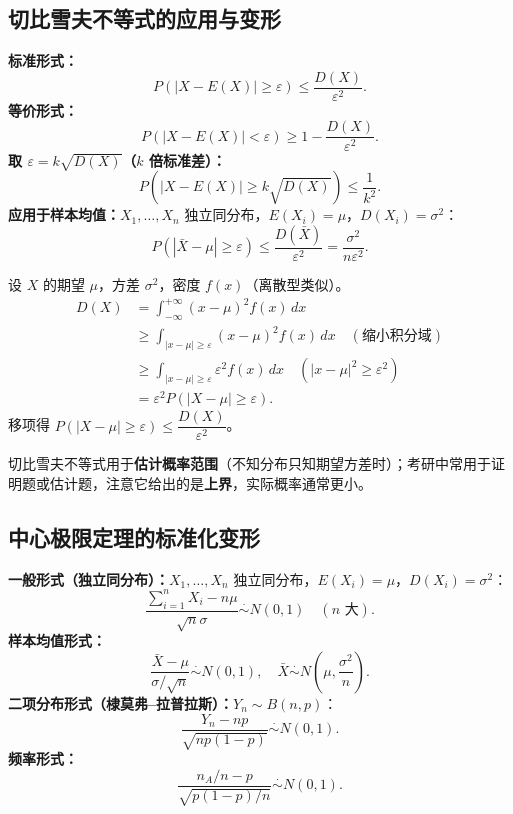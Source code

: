 \documentclass[11pt,a4paper]{article}
\begin{document}
\subsection{切比雪夫不等式的应用与变形}

\begin{variation}[切比雪夫不等式的变形]
\textbf{标准形式：}
\[
P(|X-E(X)|\geq \varepsilon) \leq \frac{D(X)}{\varepsilon^2}.
\]
\textbf{等价形式：}
\[
P(|X-E(X)|<\varepsilon) \geq 1 - \frac{D(X)}{\varepsilon^2}.
\]
\textbf{取 $\varepsilon=k\sqrt{D(X)}$（$k$ 倍标准差）：}
\[
P(|X-E(X)|\geq k\sqrt{D(X)}) \leq \frac{1}{k^2}.
\]
\textbf{应用于样本均值：}$X_1,\dots,X_n$ 独立同分布，$E(X_i)=\mu$，$D(X_i)=\sigma^2$：
\[
P(|\bar X-\mu|\geq \varepsilon) \leq \frac{D(\bar X)}{\varepsilon^2} = \frac{\sigma^2}{n\varepsilon^2}.
\]
\end{variation}

\begin{derivation}[切比雪夫不等式推导]
设 $X$ 的期望 $\mu$，方差 $\sigma^2$，密度 $f(x)$（离散型类似）。
\begin{align*}
D(X) &= \int_{-\infty}^{+\infty} (x-\mu)^2 f(x)\,dx \\
&\geq \int_{|x-\mu|\geq \varepsilon} (x-\mu)^2 f(x)\,dx \quad (\text{缩小积分域})\\
&\geq \int_{|x-\mu|\geq \varepsilon} \varepsilon^2 f(x)\,dx \quad (|x-\mu|^2\geq \varepsilon^2)\\
&= \varepsilon^2 P(|X-\mu|\geq \varepsilon).
\end{align*}
移项得 $P(|X-\mu|\geq \varepsilon)\leq \dfrac{D(X)}{\varepsilon^2}$。
\end{derivation}

\begin{examtip}[应用场景]
切比雪夫不等式用于\textbf{估计概率范围}（不知分布只知期望方差时）；考研中常用于证明题或估计题，注意它给出的是\textbf{上界}，实际概率通常更小。
\end{examtip}

\subsection{中心极限定理的标准化变形}

\begin{variation}[中心极限定理的实用形式]
\textbf{一般形式（独立同分布）：}$X_1,\dots,X_n$ 独立同分布，$E(X_i)=\mu$，$D(X_i)=\sigma^2$：
\[
\frac{\sum_{i=1}^n X_i - n\mu}{\sqrt{n}\sigma} \overset{\cdot}{\sim} N(0,1) \quad (n\text{ 大}).
\]
\textbf{样本均值形式：}
\[
\frac{\bar X - \mu}{\sigma/\sqrt n} \overset{\cdot}{\sim} N(0,1), \quad \bar X \overset{\cdot}{\sim} N\!\left(\mu, \frac{\sigma^2}{n}\right).
\]
\textbf{二项分布形式（棣莫弗--拉普拉斯）：}$Y_n\sim B(n,p)$：
\[
\frac{Y_n - np}{\sqrt{np(1-p)}} \overset{\cdot}{\sim} N(0,1).
\]
\textbf{频率形式：}
\[
\frac{n_A/n - p}{\sqrt{p(1-p)/n}} \overset{\cdot}{\sim} N(0,1).
\]
\end{variation}
\end{document}
